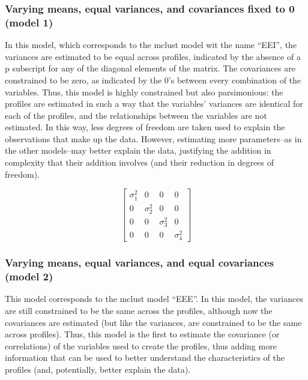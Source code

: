 \documentclass[]{msu-thesis}
\theoremstyle{definition}
\theoremstyle{definition}
\theoremstyle{definition}
\theoremstyle{remark}
\begin{document}
\subsubsection{Varying means, equal variances, and covariances fixed to
0 (model
1)}\label{varying-means-equal-variances-and-covariances-fixed-to-0-model-1}

In this model, which corresponds to the mclust model wit the name
``EEI'', the variances are estimated to be equal across profiles,
indicated by the absence of a p subscript for any of the diagonal
elements of the matrix. The covariances are constrained to be zero, as
indicated by the 0's between every combination of the variables. Thus,
this model is highly constrained but also parsimonious: the profiles are
estimated in such a way that the variables' variances are identical for
each of the profiles, and the relationships between the variables are
not estimated. In this way, less degrees of freedom are taken used to
explain the observations that make up the data. However, estimating more
parameters--as in the other models--may better explain the data,
justifying the addition in complexity that their addition involves (and
their reduction in degrees of freedom).

\[
\left[ \begin{matrix} { \sigma  }_{ 1 }^{ 2 } & 0 & 0 & 0 \\ 0 & { \sigma  }_{ 2 }^{ 2 } & 0 & 0 \\ 0 & 0 & { \sigma  }_{ 3 }^{ 2 } & 0 \\ 0 & 0 & 0 & { \sigma  }_{ 4 }^{ 2 } \end{matrix} \right] 
\]

\subsubsection{Varying means, equal variances, and equal covariances
(model
2)}\label{varying-means-equal-variances-and-equal-covariances-model-2}

This model corresponds to the mclust model ``EEE''. In this model, the
variances are still constrained to be the same across the profiles,
although now the covariances are estimated (but like the variances, are
constrained to be the same across profiles). Thus, this model is the
first to estimate the covariance (or correlations) of the variables used
to create the profiles, thus adding more information that can be used to
better understand the characteristics of the profiles (and, potentially,
better explain the data).
\end{document}
